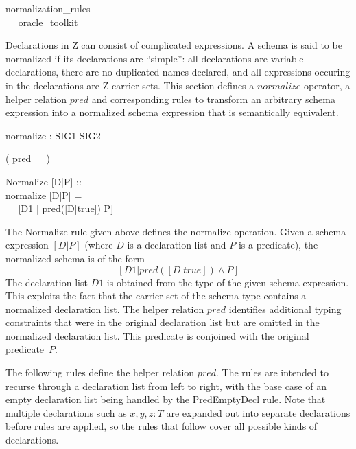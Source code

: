 \begin{zsection}
  \SECTION normalization\_rules \\~~ \parents oracle\_toolkit
\end{zsection}

Declarations in Z can consist of complicated expressions.  A schema is
said to be normalized if its declarations are ``simple'': all
declarations are variable declarations, there are no duplicated names
declared, and all expressions occuring in the declarations are Z
carrier sets.  This section defines a $normalize$ operator, a helper
relation $pred$ and corresponding rules to transform an arbitrary
schema expression into a normalized schema expression that is
semantically equivalent.

\begin{gendef}
  normalize : SIG1 \fun SIG2 \\
\end{gendef}

\begin{zed}
  \relation ( pred~\_ )
\end{zed}

\begin{zedrule}{Normalize}
   [D|P] :: \power [D1|true] \\
\derives
  normalize [D|P] = \\~~ [D1 | pred([D|true]) \land P]
\end{zedrule}

The Normalize rule given above defines the normalize operation.  Given
a schema expression $[D|P]$ (where $D$ is a declaration list and $P$
is a predicate), the normalized schema is of the form
$$[D1 | pred([D|true])\land P]$$ The declaration list $D1$ is
obtained from the type of the given schema expression.  This exploits
the fact that the carrier set of the schema type contains a normalized
declaration list.  The helper relation $pred$ identifies additional
typing constraints that were in the original declaration list but are
omitted in the normalized declaration list.  This predicate is
conjoined with the original predicate~$P$.

The following rules define the helper relation $pred$.  The rules are
intended to recurse through a declaration list from left to right,
with the base case of an empty declaration list being handled by the
PredEmptyDecl rule.  Note that multiple declarations such as $x,y,z:T$
are expanded out into separate declarations before rules are applied,
so the rules that follow cover all possible kinds of declarations.

